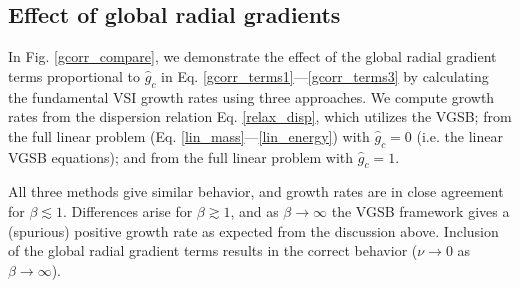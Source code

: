 
\subsection{Effect of global radial gradients}



In  Fig. \ref{gcorr_compare}, we demonstrate the effect of the global radial gradient terms
proportional to $\hat{g}_c$ in 
Eq. \ref{gcorr_terms1}---\ref{gcorr_terms3} by calculating the
fundamental VSI growth rates using three approaches. We compute growth rates from the dispersion
relation Eq. \ref{relax_disp}, which utilizes the VGSB;  from the
full linear problem (Eq. \ref{lin_mass}---\ref{lin_energy}) with
$\hat{g}_c=0$ (i.e. the linear VGSB equations); and from the full
linear problem with $\hat{g}_c=1$.  

All three methods give similar behavior, and growth rates are in close
agreement for $\beta\lesssim 1$. Differences arise for
$\beta\gtrsim1$, and as $\beta\to\infty$ the VGSB framework gives a
(spurious) positive growth rate as expected from the discussion
above. Inclusion of the global radial gradient terms results in the
correct behavior  ($\nu\to0$ as $\beta\to\infty$).  

